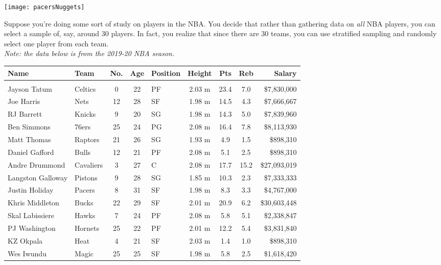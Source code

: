 \setcounter{ExampleCounter}{1}
\begin{center}
\texttt{[image: pacersNuggets]}
\end{center}
Suppose you're doing some sort of study on players in the NBA.  You decide that rather than gathering data on \emph{all} NBA players, you can select a sample of, say, around 30 players.  In fact, you realize that since there are 30 teams, you can use stratified sampling and randomly select one player from each team.\\
\emph{Note: the data below is from the 2019-20 NBA season.}

\begin{center}
{\footnotesize
\begin{tabular}{l l c c l c c c r}
\textbf{Name} & \textbf{Team} & \textbf{No.} & \textbf{Age} & \textbf{Position} & \textbf{Height} & \textbf{Pts} & \textbf{Reb} & \textbf{Salary}\\
\hline
& & & & & & & \\
Jayson Tatum & Celtics & 0 & 22 & PF & 2.03 m & 23.4 & 7.0 & \$7,830,000\\
Joe Harris & Nets & 12 & 28 & SF & 1.98 m & 14.5 & 4.3 & \$7,666,667\\
RJ Barrett & Knicks & 9 & 20 & SG & 1.98 m & 14.3 & 5.0 & \$7,839,960\\
Ben Simmons & 76ers & 25 & 24 & PG & 2.08 m & 16.4 & 7.8 & \$8,113,930\\
Matt Thomas & Raptors & 21 & 26 & SG & 1.93 m & 4.9 & 1.5 & \$898,310\\
Daniel Gafford & Bulls & 12 & 21 & PF & 2.08 m & 5.1 & 2.5 & \$898,310\\
Andre Drummond & Cavaliers & 3 & 27 & C & 2.08 m & 17.7 & 15.2 & \$27,093,019\\
Langston Galloway & Pistons & 9 & 28 & SG & 1.85 m & 10.3 & 2.3 & \$7,333,333\\
Justin Holiday & Pacers & 8 & 31 & SF & 1.98 m & 8.3 & 3.3 & \$4,767,000\\
Khris Middleton & Bucks & 22 & 29 & SF & 2.01 m & 20.9 & 6.2 & \$30,603,448\\
Skal Labissiere & Hawks & 7 & 24 & PF & 2.08 m & 5.8 & 5.1 & \$2,338,847\\
PJ Washington & Hornets & 25 & 22 & PF & 2.01 m & 12.2 & 5.4 & \$3,831,840\\
KZ Okpala & Heat & 4 & 21 & SF & 2.03 m & 1.4 & 1.0 & \$898,310\\
Wes Iwundu & Magic & 25 & 25 & SF & 1.98 m & 5.8 & 2.5 & \$1,618,420\\

\end{tabular}}
\end{center}
